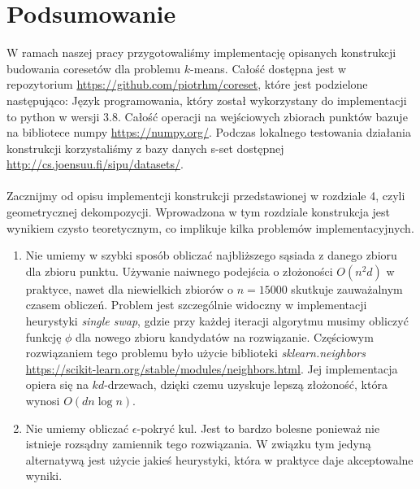 \chapter{Podsumowanie}\label{analysis}

W ramach naszej pracy przygotowaliśmy implementację opisanych konstrukcji budowania coresetów dla problemu $k$-means.
Całość dostępna jest w repozytorium \url{https://github.com/piotrhm/coreset}, które jest podzielone następująco:
\noindent
Język programowania, który został wykorzystany do implementacji to python w wersji 3.8.
Całość operacji na wejściowych zbiorach punktów bazuje na bibliotece numpy \url{https://numpy.org/}.
Podczas lokalnego testowania działania konstrukcji korzystaliśmy z bazy danych s-set dostępnej \url{http://cs.joensuu.fi/sipu/datasets/}.
\\~\\
Zacznijmy od opisu implementcji konstrukcji przedstawionej w rozdziale 4, czyli geometrycznej dekompozycji.
Wprowadzona w tym rozdziale konstrukcja jest wynikiem czysto teoretycznym, co implikuje kilka problemów implementacyjnych.
\begin{enumerate}
    \item Nie umiemy w szybki sposób obliczać najbliższego sąsiada z danego zbioru dla zbioru punktu.
    Używanie naiwnego podejścia o złożoności $O(n^2d)$ w praktyce, nawet dla niewielkich zbiorów o $n=15000$ skutkuje zauważalnym czasem obliczeń.
    Problem jest szczególnie widoczny w implementacji heurystyki \textit{single swap}, gdzie przy każdej iteracji algorytmu musimy obliczyć funkcję $\phi$ dla nowego zbioru kandydatów na rozwiązanie.
    Częściowym rozwiązaniem tego problemu było użycie biblioteki \textit{sklearn.neighbors} \url{https://scikit-learn.org/stable/modules/neighbors.html}.
    Jej implementacja opiera się na $kd$-drzewach, dzięki czemu uzyskuje lepszą złożoność, która wynosi $O(dn \log n)$.
    \item Nie umiemy obliczać $\epsilon$-pokryć kul.
    Jest to bardzo bolesne ponieważ nie istnieje rozsądny zamiennik tego rozwiązania.
    W związku tym jedyną alternatywą jest użycie jakieś heurystyki, która w praktyce daje akceptowalne wyniki.
\end{enumerate}

